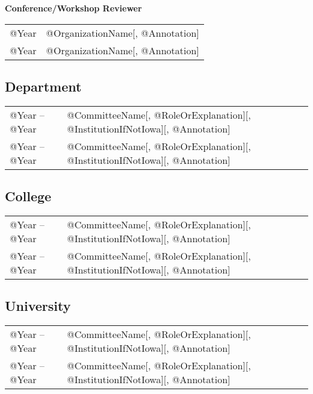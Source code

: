 \documentclass[10pt]{article}
\begin{document}
\begin{itemize}
\begin{IOWA ONLY}
\item[] \textbf{Conference/Workshop Reviewer}
\\[1.3ex]
\begin{tabular}{l@{\quad\ }p{34em}} 
 @Year & @OrganizationName[, @Annotation]
 \\[.5ex]
 @Year & @OrganizationName[, @Annotation]
\end{tabular}
\end{IOWA ONLY}

\end{itemize}

\begin{IOWA ONLY}
\subsection*{Department}

\begin{tabular}{l@{\quad\ }p{34em}} 
 @Year -- @Year 
 & @CommitteeName[, @RoleOrExplanation][, @InstitutionIfNotIowa][, @Annotation]
 \\[.5ex]
 @Year -- @Year 
 & @CommitteeName[, @RoleOrExplanation][, @InstitutionIfNotIowa][, @Annotation]
\end{tabular}

\subsection*{College}

\begin{tabular}{l@{\quad\ }p{34em}} 
 @Year -- @Year 
 & @CommitteeName[, @RoleOrExplanation][, @InstitutionIfNotIowa][, @Annotation]
 \\[.5ex]
 @Year -- @Year 
 & @CommitteeName[, @RoleOrExplanation][, @InstitutionIfNotIowa][, @Annotation]
\end{tabular}

\subsection*{University}

\begin{tabular}{l@{\quad\ }p{34em}} 
 @Year -- @Year 
 & @CommitteeName[, @RoleOrExplanation][, @InstitutionIfNotIowa][, @Annotation]
 \\[.5ex]
 @Year -- @Year 
 & @CommitteeName[, @RoleOrExplanation][, @InstitutionIfNotIowa][, @Annotation]
\end{tabular}


\end{IOWA ONLY}
\end{document}
